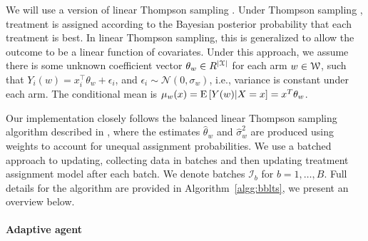 \documentclass[letterpaper, 12pt, parskip=full,]{scrartcl}
\begin{document}
We will use a version of linear Thompson sampling \citep{agrawal2013thompson}. Under Thompson sampling \citep{thompson1933likelihood,thompson1935theory}, treatment is assigned according to the Bayesian posterior probability that each treatment is best. In linear Thompson sampling, this is generalized to allow the outcome to be a linear function of covariates. Under this approach, we assume there is some unknown coefficient vector $\theta_w\in R^{|{\EuScript X}|}$ for each arm $w \in {\EuScript W}$, such that $Y_i(w) = x_i^\top \theta_w + \epsilon_i$, and $\epsilon_i\sim \mathcal{N}(0, \sigma_w)$, i.e., variance is constant under each arm. The conditional mean is $\mu_w(x) = {\textrm E}\,[Y(w)|X=x] = x^T \theta_w$. 



Our implementation closely follows the balanced linear Thompson sampling algorithm described in \cite{dimakopoulou2017estimation, dimakopoulou2019balanced}, where the estimates $\hat\theta_w$ and $\hat\sigma^2_w$ are produced using weights to account for unequal assignment probabilities. We use a batched approach to updating, collecting data in batches and then updating treatment assignment model after each batch. We denote batches $\mathcal{I}_b$ for $b = 1, \dots, B$. Full details for the algorithm are provided in Algorithm~\ref{algg:bblts}, we present an overview below. 

\paragraph{Adaptive agent}
\end{document}
